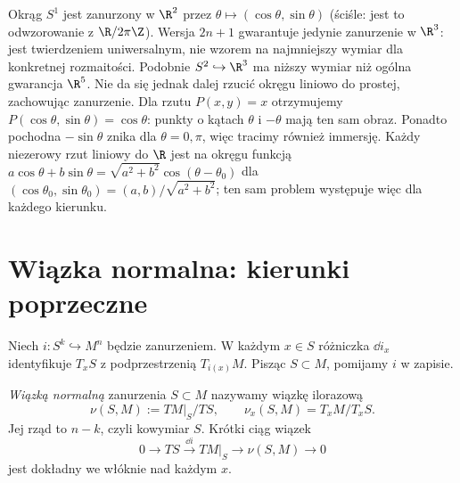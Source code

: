 \begin{przyklad}
Okrąg $S^1$ jest zanurzony w $\R^2$ przez
$\theta\mapsto(\cos\theta,\sin\theta)$
(ściśle: jest to odwzorowanie z $\R/2\pi\Z$).
Wersja $2n+1$ gwarantuje jedynie
zanurzenie w $\R^3$: jest twierdzeniem
uniwersalnym, nie wzorem na najmniejszy
wymiar dla konkretnej rozmaitości.
Podobnie $S^2\hookrightarrow\R^3$ ma
niższy wymiar niż ogólna gwarancja $\R^5$.
Nie da się jednak dalej rzucić okręgu liniowo do prostej,
zachowując zanurzenie. Dla rzutu $P(x,y)=x$
otrzymujemy $P(\cos\theta,\sin\theta)=\cos\theta$:
punkty o kątach $\theta$ i $-\theta$ mają ten sam obraz.
Ponadto pochodna $-\sin\theta$ znika dla $\theta=0,\pi$,
więc tracimy również immersję.
Każdy niezerowy rzut liniowy do $\R$ jest na okręgu
funkcją $a\cos\theta+b\sin\theta
=\sqrt{a^2+b^2}\cos(\theta-\theta_0)$
dla $(\cos\theta_0,\sin\theta_0)=(a,b)/\sqrt{a^2+b^2}$;
ten sam problem występuje więc dla każdego kierunku.

\begin{center}
\end{center}
\end{przyklad}

\section{Wiązka normalna: kierunki poprzeczne}
\label{sec:wiazka-normalna}

Niech $i:S^k\hookrightarrow M^n$ będzie
zanurzeniem. W każdym $x\in S$ różniczka
$\dd i_x$ identyfikuje $T_xS$ z
podprzestrzenią $T_{i(x)}M$.
Pisząc $S\subset M$, pomijamy $i$ w zapisie.

\begin{definicja}
\label{def:wiazka-normalna-15}
\emph{Wiązką normalną} zanurzenia $S\subset M$
nazywamy wiązkę ilorazową
\[
 \nu(S,M):=TM|_S/TS,\qquad
 \nu_x(S,M)=T_xM/T_xS.
\]
Jej rząd to $n-k$, czyli kowymiar $S$.
Krótki ciąg wiązek
\begin{equation}\label{eq:normalny-ciag}
 0\longrightarrow TS
 \stackrel{\dd i}{\longrightarrow}TM|_S
 \longrightarrow\nu(S,M)\longrightarrow0
\end{equation}
jest dokładny we włóknie nad każdym $x$.
\end{definicja}

